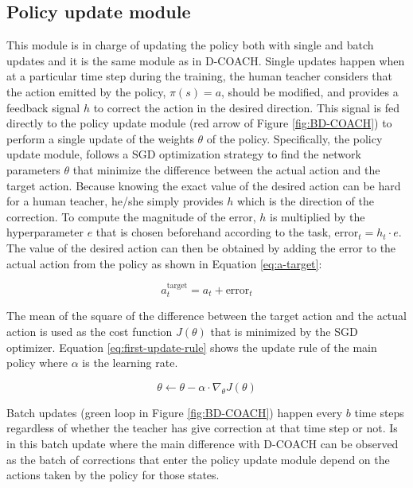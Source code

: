 \subsection*{Policy update module}
This module is in charge of updating the policy both with single and batch updates and it is the same module as in D-COACH.
Single updates happen when at a particular time step during the training, the human teacher considers that the action emitted by the policy, $\pi(s) = a$, should be modified, and provides a feedback signal $h$ to correct the action in the desired direction. This signal is fed directly to the policy update module (red arrow of Figure \ref{fig:BD-COACH}) to perform a single update of the weights $\theta$ of the policy. Specifically, the policy update module, follows a SGD optimization strategy to find the network parameters $\theta$ that minimize the difference between the actual action and the target action. Because knowing the exact value of the desired action can be hard for a human teacher, he/she simply provides $h$ which is the direction of the correction. To compute the magnitude of the error, $h$ is multiplied by the hyperparameter $e$ that is chosen beforehand according to the task, $\text{error}_t = h_t \cdot  e$. The value of the desired action can then be obtained by adding the error to the actual action from the policy as shown in Equation \eqref{eq:a-target}:

\begin{equation}
a^\text{target}_t = a_t + \text{error}_t
\label{eq:a-target}
\end{equation}


The mean of the square of the difference between the target action and the actual action is used as the cost function $J(\theta)$ that is minimized by the SGD optimizer. Equation \eqref{eq:first-update-rule} shows the update rule of the main policy where $\alpha$ is the learning rate.


\begin{equation}
\theta \leftarrow \theta - \alpha \cdot \nabla_\theta J(\theta)
\label{eq:first-update-rule}
\end{equation}

Batch updates (green loop in Figure \ref{fig:BD-COACH}) happen every $b$ time steps regardless of whether the teacher has give correction at that time step or not. Is in this batch update where the main difference with D-COACH can be observed as the batch of corrections that enter the policy update module depend on the actions taken by the policy for those states.




